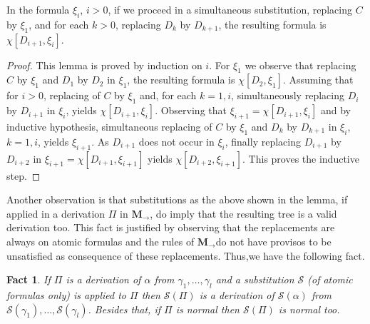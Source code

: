 \documentclass[11pt]{llncs}
\newtheorem{fact}{Fact}
\newcommand{\mil}{\ensuremath{\mathbf{M}_{\rightarrow}}}
\begin{document}
\begin{lemma}\label{subs}
In the formula $\xi_i$, $i>0$, if we proceed in a simultaneous substitution, replacing $C$ by $\xi_1$, and for each $k>0$, replacing $D_{k}$ by $D_{k+1}$, the resulting formula is $\chi[D_{i+1},\xi_i]$. 
\end{lemma}

\begin{proof}
This lemma is proved by induction on $i$. For $\xi_1$ we observe that replacing $C$ by $\xi_1$ and $D_1$ by $D_2$ in $\xi_1$, the resulting formula is $\chi[D_2,\xi_1]$. Assuming that for $i>0$, replacing of $C$ by $\xi_1$ and, for each $k=1,i$, simultaneously replacing  $D_i$ by $D_{i+1}$ in $\xi_i$,  yields $\chi[D_{i+1},\xi_i]$. Observing that $\xi_{i+1}=\chi[D_{i+1},\xi_i]$ and by inductive hypothesis, simultaneous replacing of $C$ by $\xi_1$ and $D_k$ by $D_{k+1}$ in $\xi_{i}$, $k=1,i$, yields $\xi_{i+1}$. As $D_{i+1}$ does not occur in $\xi_i$, finally replacing $D_{i+1}$ by $D_{i+2}$ in $\xi_{i+1}=\chi[D_{i+1},\xi_{i+1}]$ yields $\chi[D_{i+2},\xi_{i+1}]$. This proves the inductive step. 
\end{proof}

Another observation is that substitutions as the above shown in the lemma, if applied in a derivation $\Pi$ in \mil, do imply that the resulting tree is a valid derivation too. This fact is justified by observing that the replacements are always on atomic formulas and the rules of \mil do not have provisos to be unsatisfied as consequence of these replacements. Thus,we have the following fact.

\begin{fact}\label{fato}
If $\Pi$ is a derivation of $\alpha$ from $\gamma_1,\ldots,\gamma_l$ and a substitution $\mathcal{S}$ (of atomic formulas only) is applied to $\Pi$ then $\mathcal{S}(\Pi)$ is a derivation of $\mathcal{S}(\alpha)$ from $\mathcal{S}(\gamma_1),\ldots,\mathcal{S}(\gamma_l)$. Besides that, if $\Pi$ is normal then $\mathcal{S}(\Pi)$ is normal too. 
\end{fact} 
\end{document}
